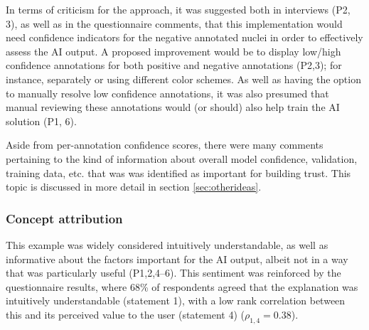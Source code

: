 In terms of criticism for the approach, it was suggested both in interviews (P2, 3), as well as in the questionnaire comments, that this implementation would need confidence indicators for the negative annotated nuclei in order to effectively assess the AI output. A proposed improvement would be to display low/high confidence annotations for both positive and negative annotations (P2,3); for instance, separately or using different color schemes. As well as having the option to manually resolve low confidence annotations, it was also presumed that manual reviewing these annotations would (or should) also help train the AI solution (P1, 6).


Aside from per-annotation confidence scores, there were many comments pertaining to the kind of information about overall model confidence, validation, training data, etc. that was was identified as important for building trust. This topic is discussed in more detail in section \ref{sec:otherideas}.



\subsubsection{Concept attribution}


This example was widely considered intuitively understandable, as well as informative about the factors important for the AI output, albeit not in a way that was particularly useful (P1,2,4--6). This sentiment was reinforced by the questionnaire results, where 68\% of respondents agreed that the explanation was intuitively understandable (statement 1), with a low rank correlation between this and its perceived value to the user (statement 4) (\(\rho_{1,4} = 0.38\)).


